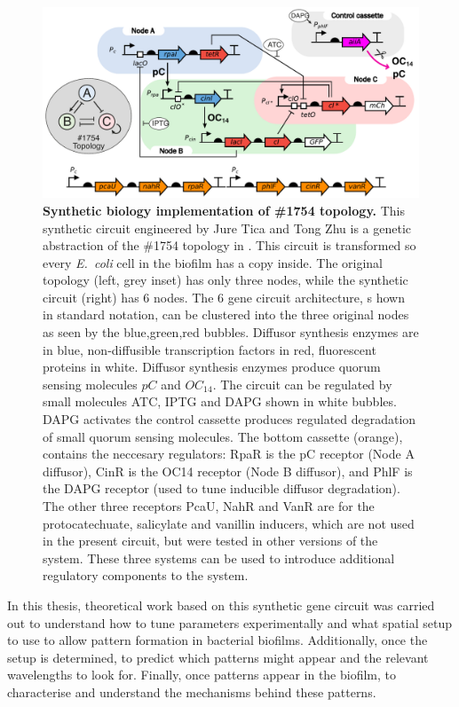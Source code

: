 \begin{figure}[H]
    \centering
    \includegraphics[width=1\textwidth]{chapters/Chapter 2/synthetic circuit2}
    \caption{\textbf{Synthetic biology implementation of \#1754 topology.} This synthetic circuit engineered by Jure Tica and Tong Zhu is a genetic abstraction of the \#1754 topology in \cite{Scholes2019}. This circuit is transformed so every \textit{E.~coli} cell in the biofilm has a copy inside. The original topology (left, grey inset) has only three nodes, while the synthetic circuit (right) has 6 nodes. The 6 gene circuit architecture, s hown in standard notation, can be clustered into the three original nodes as seen by the blue,green,red bubbles. Diffusor synthesis enzymes are in blue, non-diffusible transcription
    factors in red, fluorescent proteins in white. Diffusor synthesis enzymes produce quorum sensing molecules $pC$ and $OC_{14}$. The circuit can be regulated by small molecules ATC, IPTG and DAPG shown in white bubbles. DAPG activates the control cassette produces regulated degradation of small quorum sensing molecules. The bottom cassette (orange), contains the neccesary regulators: RpaR is the pC receptor (Node A diffusor), CinR is the OC14 receptor (Node B diffusor), and PhlF is the DAPG receptor (used to tune inducible diffusor degradation). The other three receptors PcaU, NahR and VanR are for the protocatechuate, salicylate and vanillin inducers, which are not used in the present circuit, but were tested in other versions of the system. These three systems can be used to introduce additional regulatory components to the system.}
    \label{fig:synthetic circuit}
\end{figure}

In this thesis, theoretical work based on this synthetic gene circuit was carried out to understand how to tune parameters experimentally and what spatial setup to use to allow pattern formation in bacterial biofilms.
Additionally, once the setup is determined, to predict which patterns might appear and the relevant wavelengths to look for.
Finally, once patterns appear in the biofilm, to characterise and understand the mechanisms behind these patterns.


